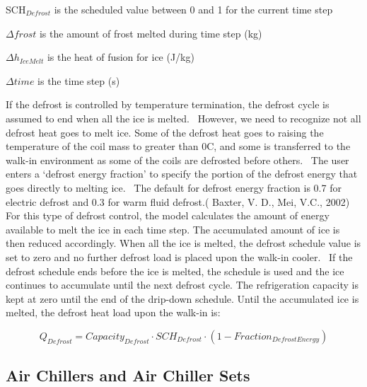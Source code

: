 SCH\(_{Defrost}\) is the scheduled value between 0 and 1 for the current time step

\(\Delta frost\) is the amount of frost melted during time step (kg)

\(\Delta h_{IceMelt}\) is the heat of fusion for ice (J/kg)

\(\Delta time\) is the time step (s)

If the defrost is controlled by temperature termination, the defrost cycle is assumed to end when all the ice is melted.~ However, we need to recognize not all defrost heat goes to melt ice. Some of the defrost heat goes to raising the temperature of the coil mass to greater than 0C, and some is transferred to the walk-in environment as some of the coils are defrosted before others.~ The user enters a `defrost energy fraction' to specify the portion of the defrost energy that goes directly to melting ice.~ The default for defrost energy fraction is 0.7 for electric defrost and 0.3 for warm fluid defrost.( Baxter, V. D., Mei, V.C., 2002) For this type of defrost control, the model calculates the amount of energy available to melt the ice in each time step. The accumulated amount of ice is then reduced accordingly. When all the ice is melted, the defrost schedule value is set to zero and no further defrost load is placed upon the walk-in cooler.~ If the defrost schedule ends before the ice is melted, the schedule is used and the ice continues to accumulate until the next defrost cycle. The refrigeration capacity is kept at zero until the end of the drip-down schedule. Until the accumulated ice is melted, the defrost heat load upon the walk-in is:

\begin{equation}
Q_{Defrost} = Capacity_{Defrost} \cdot SCH_{Defrost} \cdot (1- Fraction_{DefrostEnergy})
\end{equation}

\subsection{Air Chillers and Air Chiller Sets}\label{air-chillers-and-air-chiller-sets}


